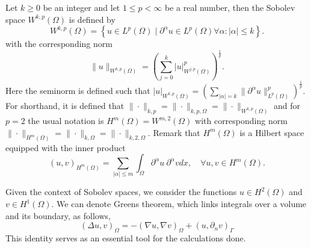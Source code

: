   Let $k\ge 0$ be an integer and let $1 \le  p <  \infty$ be a real number, then the Sobolev space $W^{k,p}( \Omega ) $ is defined by
  \begin{equation}
W^{k,p}\left( \Omega  \right) = \left\{ u \in L^{p}\left( \Omega  \right)  \mid  \partial ^{\alpha } u \in L^{p}\left( \Omega  \right)  \forall \alpha : \left\lvert \alpha  \right\rvert  \le k \right\}.
  \end{equation}
with the corresponding norm
\begin{equation}
\| u \|_{ W^{k,p}\left( \Omega  \right)  }^{  }  = \left(   \sum_{j = 0}^{k}  \left\lvert u \right\rvert ^{p} _{  W^{j,p}\left( \Omega  \right) } \right)^{\frac{1}{p}} .
\end{equation}
Here the seminorm is defined such that $ \left\lvert u \right\rvert _{W^{k,p}( \Omega  ) }^{} =  ( \sum_{\left\lvert \alpha  \right\rvert  = k}^{} \| \partial ^{\alpha }u \|_{ L^{p}( \Omega )   }^{ p } )^{\frac{1}{p}} $.  For shorthand, it is
defined that $\| \cdot
\|_{k,p}^{  } = \| \cdot  \|_{k,p,\Omega   }^{  } = \| \cdot  \|_{ W^{k,p}( \Omega )   }^{  }  $ and for $p=2$ the usual notation is $H^{m}( \Omega ) = W^{m,2}( \Omega )  $ with corresponding norm $\| \cdot  \|_{H^{m}( \Omega )   }^{  } = \| \cdot
\|_{k,\Omega   }^{  } = \| \cdot  \|_{k,2,\Omega   }^{  } $.
Remark that $H^{m}( \Omega ) $ is a Hilbert space equipped with the inner product \[
    \left( u,v \right) _{H^{m}\left( \Omega   \right) } = \sum_{\left\lvert \alpha  \right\rvert  \le  m}^{}  \int_{\Omega }^{} \partial ^{\alpha } u \  \partial ^{\alpha } v dx, \quad  \forall u,v \in H^{m}\left( \Omega  \right).
\]

Given the context of Sobolev spaces, we consider the functions $ u \in H^{2}( \Omega )$ and $ v \in H^{1}( \Omega )$. We can denote Greens theorem, which links integrals over a volume and its boundary, as follows,
\[
( \Delta u, v) _{\Omega } = -( \nabla u, \nabla v)_{\Omega } + ( u, \partial _{n}v)_{\Gamma }
\]
This identity serves as an essential tool for the calculations done.



